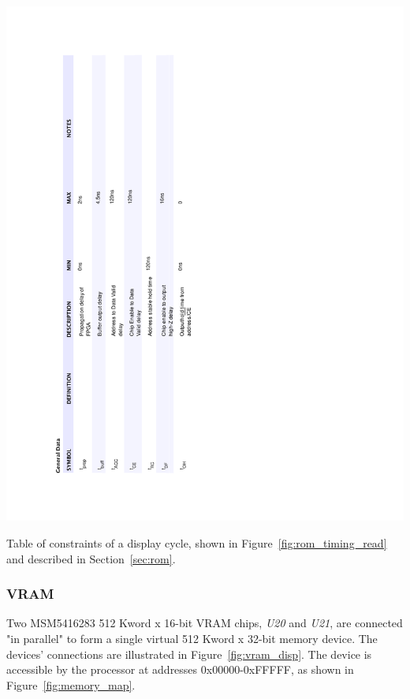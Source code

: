 \documentclass[titlepage]{scrartcl}
\begin{document}
	\begin{table}[h!]
	\vspace{-2cm}
	\centerline{\includegraphics[width=20cm]{img/rom_read_table.pdf}}
		\vspace{0cm}
                	\caption{Table of constraints of a display cycle, shown in Figure~\ref{fig:rom_timing_read} and described in Section~\ref{sec:rom}.}
               	\label{tab:rom_timing_read}
	\end{table}

	\clearpage
	
	\subsubsection{VRAM \label{sec:vram}}
	Two MSM5416283 512 Kword x 16-bit VRAM chips, \textit{U20} and \textit{U21}, are connected "in parallel" to form a single virtual 512 Kword x 32-bit memory device. The devices' connections are illustrated in Figure~\ref{fig:vram_disp}. The device is accessible by the processor at addresses 0x00000-0xFFFFF, as shown in Figure~\ref{fig:memory_map}.\\
\end{document}

